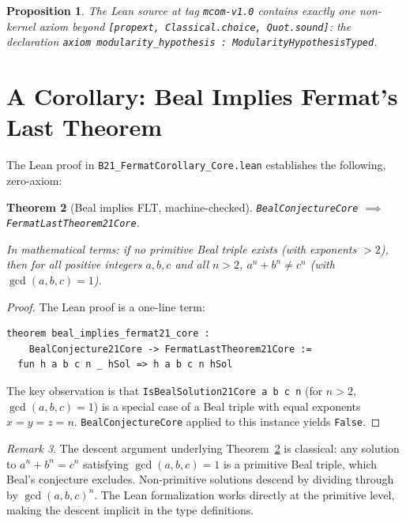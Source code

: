 \documentclass[12pt,reqno]{amsart}
\theoremstyle{plain}
\newtheorem{theorem}{Theorem}[section]
\newtheorem{proposition}[theorem]{Proposition}
\theoremstyle{definition}
\theoremstyle{remark}
\newtheorem{remark}[theorem]{Remark}
\begin{document}
\begin{proposition}
The Lean source at tag \texttt{mcom-v1.0} contains exactly one
non-kernel axiom beyond \texttt{[propext, Classical.choice, Quot.sound]}:
the declaration \texttt{axiom modularity\_hypothesis : ModularityHypothesisTyped}.
\end{proposition}

\section{A Corollary: Beal Implies Fermat's Last Theorem}
\label{sec:corollary}

The Lean proof in \texttt{B21\_FermatCorollary\_Core.lean} establishes
the following, zero-axiom:

\begin{theorem}[Beal implies FLT, machine-checked]
\label{thm:beal-implies-flt}
\texttt{BealConjectureCore} $\implies$ \texttt{FermatLastTheorem21Core}.

In mathematical terms: if no primitive Beal triple exists (with exponents
$>2$), then for all positive integers $a,b,c$ and all $n>2$,
$a^n+b^n\neq c^n$ (with $\gcd(a,b,c)=1$).
\end{theorem}

\begin{proof}
The Lean proof is a one-line term:
\begin{lstlisting}
theorem beal_implies_fermat21_core :
    BealConjecture21Core -> FermatLastTheorem21Core :=
  fun h a b c n _ hSol => h a b c n hSol
\end{lstlisting}
The key observation is that \texttt{IsBealSolution21Core a b c n}
(for $n>2$, $\gcd(a,b,c)=1$) is a special case of a Beal triple with
equal exponents $x=y=z=n$. \texttt{BealConjectureCore} applied to
this instance yields \texttt{False}.
\end{proof}

\begin{remark}
The descent argument underlying Theorem~\ref{thm:beal-implies-flt}
is classical: any solution to $a^n+b^n=c^n$ satisfying $\gcd(a,b,c)=1$
is a primitive Beal triple, which Beal's conjecture excludes.
Non-primitive solutions descend by dividing through by $\gcd(a,b,c)^n$.
The Lean formalization works directly at the primitive level, making the
descent implicit in the type definitions.
\end{remark}

\end{document}
